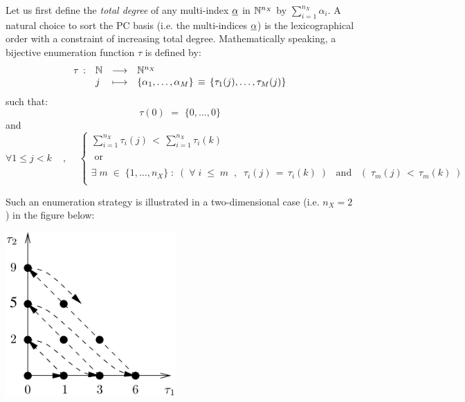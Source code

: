 {  Let us first define the \emph{total degree} of any multi-index $\underline{\alpha}$ in ${\mathbb N}^{n_X}$ by $\sum_{i=1}^{n_X} \alpha_i$. A natural choice to sort the PC basis (i.e. the multi-indices $\underline{\alpha}$) is the lexicographical order with a constraint of increasing total degree. Mathematically speaking, a bijective enumeration function $\tau$ is defined by:
  \begin{equation}
    \begin{array}{llcl}
      \tau \, : & {\mathbb N} & \longrightarrow & {\mathbb N}^{n_X} \\
      &  j & \longmapsto & \{\alpha_1,\dots, \alpha_M\} \, \equiv \, \{\tau_1(j),\dots,\tau_M(j)\} \\
    \end{array}
  \end{equation}
  such that:
  \begin{equation}
    \tau(0) \, \, = \, \, \{0,\dots,0\}
  \end{equation}
  and
  \begin{equation}
    \forall 1 \leq j<k  \quad \, , \quad \, \left\{
    \begin{array}{l}
      \displaystyle{\sum_{i=1}^{n_X} \tau_i(j) \, < \,  \sum_{i=1}^{n_X} \tau_i(k)  }  \\
      \\
      \mbox{ or} \\
      \\
      \displaystyle{\exists \; m \; \in \; \{1,\dots,n_X\} \; : \; \left( \; \forall \; i \; \leq \; m \; \; , \; \; \tau_i(j) \, = \, \tau_i(k) \; \right) \, \, \, \mbox{ and } \, \, \, \left( \; \tau_m(j) \, < \, \tau_m(k) \; \right)} \\
    \end{array}
    \right.
  \end{equation}


  Such an enumeration strategy is illustrated in a two-dimensional case (i.e. $n_X=2$) in the figure below:

  \begin{center}                \includegraphics[width = 6.5cm]{Figures/enumerate.pdf} \end{center}

}
